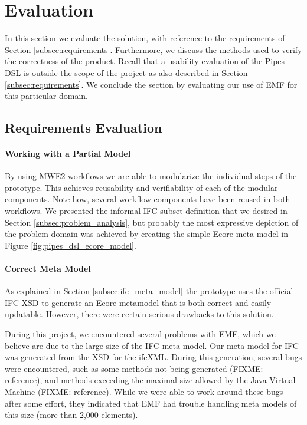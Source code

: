 \section{Evaluation}
In this section we evaluate the solution, with reference to the requirements of Section \ref{subsec:requirements}. Furthermore, we discuss the methods used to verify the correctness of the product. Recall that a usability evaluation of the Pipes DSL is outside the scope of the project as also described in Section \ref{subsec:requirements}. We conclude the section by evaluating our use of EMF for this particular domain.


\subsection{Requirements Evaluation}
\label{subsec:requirements_evaluation}
\paragraph{Working with a Partial Model} By using MWE2 workflows we are able to modularize the individual steps of the prototype. This achieves reusability and verifiability of each of the modular components. Note how, several workflow components have been reused in both workflows. We presented the informal IFC subset definition that we desired in Section \ref{subsec:problem_analysis}, but probably the most expressive depiction of the problem domain was achieved by creating the simple Ecore meta model in Figure \ref{fig:pipes_dsl_ecore_model}.

\paragraph{Correct Meta Model} As explained in Section \ref{subsec:ifc_meta_model} the prototype uses the official IFC XSD to generate an Ecore metamodel that is both correct and easily updatable. However, there were certain serious drawbacks to this solution.

During this project, we encountered several problems with EMF, which we believe are due to the large size of the IFC meta model. Our meta model for IFC was generated from the XSD for the ifcXML. During this generation, several bugs were encountered, such as some methods not being generated (FIXME: reference), and methods exceeding the maximal size allowed by the Java Virtual Machine (FIXME: reference). While we were able to work around these bugs after some effort, they indicated that EMF had trouble handling meta models of this size (more than 2,000 elements).

